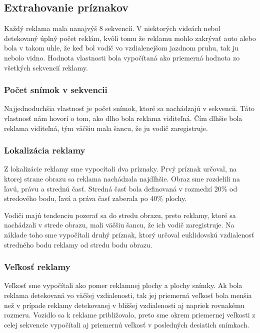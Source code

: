 \subsection{Extrahovanie príznakov}

Každý reklama mala nanajvýš 8 sekvencíí. V niektorých videách nebol detekovaný úplný počet reklám, kvôli tomu že reklamu mohlo zakrývať auto alebo bola v takom uhle, že keď bol vodič vo vzdialenejšom jazdnom pruhu, tak ju nebolo vidno. Hodnota vlastnosti bola vypočítaná ako priemerná hodnota zo všetkých sekvencií reklamy.

\subsubsection{Počet snímok v sekvencii}

Najjednoduchšia vlastnosť je počet snímok, ktoré sa nachádzajú v sekvencii. Táto vlastnosť nám hovorí o tom, ako dlho bola reklama viditeľná. Čím dlhšie bola reklama viditeľná, tým väčšiu mala šancu, že ju vodič zaregistruje.

\subsubsection{Lokalizácia reklamy}

Z lokalizácie reklamy sme vypocítali dva príznaky. Prvý príznak určoval, na ktorej strane obrazu sa reklama nachádzala najdlhšie. Obraz sme rozdelili na ľavú, právu a strednú časť. Stredná časť bola definovaná v rozmedzí 20\% od stredového bodu, ľavá a práva časť zaberala po 40\% plochy.

Vodiči majú tendenciu pozerať sa do stredu obrazu, preto reklamy, ktoré sa nachádzali v strede obrazu, mali väčšiu šancu, že ich vodič zaregistruje. Na základe toho sme vypočítali druhý príznak, ktorý určoval euklidovskú vzdialenosť stredného bodu reklamy od stredu bodu obrazu.

\subsubsection{Veľkosť reklamy}

Veľkosť sme vypočítali ako pomer reklamnej plochy a plochy snímky. Ak bola reklama detekovaná vo väčšej vzdialenosti, tak jej priemerná veľkosť bola menšia než v prípade reklamy detekovanej v bližšej vzdialenosti aj napriek rovnakému rozmeru. Vozidlo sa k reklame približovalo, preto sme okrem priemernej veľkosti z celej sekvencie vypočítali aj priemernú veľkosť v posledných desiatich snímkach.

